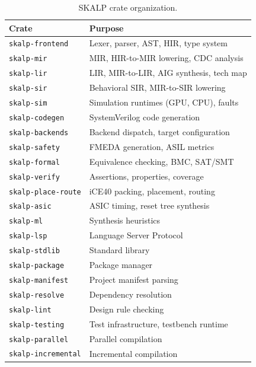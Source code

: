 \documentclass[conference]{IEEEtran}
\begin{document}
\begin{table}[t]
  \centering
  \caption{SKALP crate organization.}
  \label{tab:crates}
  \small
  \begin{tabular}{@{}ll@{}}
    \toprule
    Crate & Purpose \\
    \midrule
    \texttt{skalp-frontend} & Lexer, parser, AST, HIR, type system \\
    \texttt{skalp-mir} & MIR, HIR-to-MIR lowering, CDC analysis \\
    \texttt{skalp-lir} & LIR, MIR-to-LIR, AIG synthesis, tech map \\
    \texttt{skalp-sir} & Behavioral SIR, MIR-to-SIR lowering \\
    \texttt{skalp-sim} & Simulation runtimes (GPU, CPU), faults \\
    \texttt{skalp-codegen} & SystemVerilog code generation \\
    \texttt{skalp-backends} & Backend dispatch, target configuration \\
    \texttt{skalp-safety} & FMEDA generation, ASIL metrics \\
    \texttt{skalp-formal} & Equivalence checking, BMC, SAT/SMT \\
    \texttt{skalp-verify} & Assertions, properties, coverage \\
    \texttt{skalp-place-route} & iCE40 packing, placement, routing \\
    \texttt{skalp-asic} & ASIC timing, reset tree synthesis \\
    \texttt{skalp-ml} & Synthesis heuristics \\
    \texttt{skalp-lsp} & Language Server Protocol \\
    \texttt{skalp-stdlib} & Standard library \\
    \texttt{skalp-package} & Package manager \\
    \texttt{skalp-manifest} & Project manifest parsing \\
    \texttt{skalp-resolve} & Dependency resolution \\
    \texttt{skalp-lint} & Design rule checking \\
    \texttt{skalp-testing} & Test infrastructure, testbench runtime \\
    \texttt{skalp-parallel} & Parallel compilation \\
    \texttt{skalp-incremental} & Incremental compilation \\
    \bottomrule
  \end{tabular}
\end{table}
\end{document}
